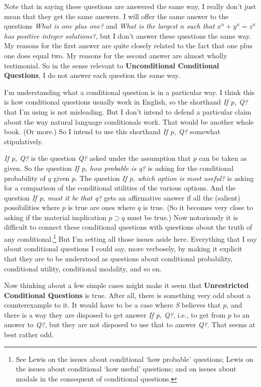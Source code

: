\documentclass[11pt,]{book}
\let\rmarkdownfootnote\footnote%
\def\footnote{\protect\rmarkdownfootnote}
\begin{document}
Note that in saying these questions are answered the same way, I really don't just mean that they get the same answers. I will offer the same answer to the questions \emph{What is one plus one?} and \emph{What is the largest \(n\) such that \(x^n + y^n = z^n\) has positive integer solutions?}, but I don't answer these questions the same way. My reasons for the first answer are quite closely related to the fact that one plus one does equal two. My reasons for the second answer are almost wholly testimonial. So in the sense relevant to \textbf{Unconditional Conditional Questions}, I do not answer each question the same way.

I'm understanding what a conditional question is in a particular way. I think this is how conditional questions usually work in English, so the shorthand \emph{If p, Q?} that I'm using is not misleading. But I don't intend to defend a particular claim about the way natural language conditionals work. That would be another whole book. (Or more.) So I intend to use this shorthand \emph{If p, Q?} somewhat stipulatively.

\emph{If p, Q?} is the question \emph{Q?} asked under the assumption that \emph{p} can be taken as given. So the question \emph{If p, how probable is q?} is asking for the conditional probability of \(q\) given \(p\). The question \emph{If p, which option is most useful?} is asking for a comparison of the conditional utilities of the various options. And the question \emph{If p, must it be that q?} gets an affirmative answer if all the (salient) possibilities where \(p\) is true are ones where \(q\) is true. (So it becomes very close to asking if the material implication \(p \supset q\) must be true.) Now notoriously it is difficult to connect these conditional questions with questions about the truth of any conditional.\footnote{See Lewis \citetext{\citeyear{Lewis1976b}; \citeyear{Lewis1986h}} on the issues about conditional `how probable' questions; Lewis \citetext{\citeyear{Lewis1988}; \citeyear{Lewis1996}} on the issues about conditional `how useful' questions; and \citet{Gillies2010} on issues about modals in the consequent of conditional questions.} But I'm setting all those issues aside here. Everything that I say about conditional questions I could say, more verbosely, by making it explicit that they are to be understood as questions about conditional probability, conditional utility, conditional modality, and so on.

Now thinking about a few simple cases might make it seem that \textbf{Unrestricted Conditional Questions} is true. After all, there is something very odd about a counterexample to it. It would have to be a case where \emph{S} believes that \(p\), and there is a way they are disposed to get answer \emph{If p, Q?}, i.e., to get from \(p\) to an answer to \emph{Q?}, but they are not disposed to use that to answer \emph{Q?}. That seems at best rather odd.
\end{document}
